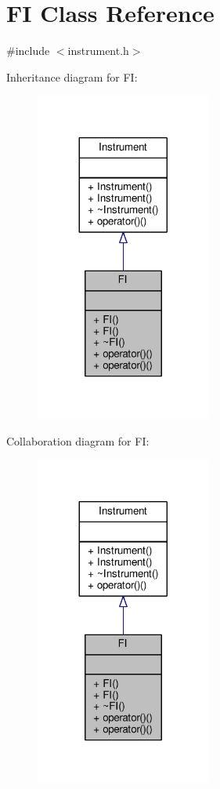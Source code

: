 \hypertarget{classFI}{}\section{FI Class Reference}
\label{classFI}


{\ttfamily \#include $<$instrument.\+h$>$}



Inheritance diagram for FI\+:
\nopagebreak
\begin{figure}[H]
\begin{center}
\leavevmode
\includegraphics[width=164pt]{classFI__inherit__graph}
\end{center}
\end{figure}


Collaboration diagram for FI\+:
\nopagebreak
\begin{figure}[H]
\begin{center}
\leavevmode
\includegraphics[width=164pt]{classFI__coll__graph}
\end{center}
\end{figure}
